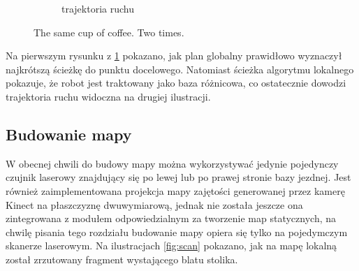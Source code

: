 \begin{figure}[h!]
\begin{subfigure}[b]{0.4\linewidth}
   				 \caption{trajektoria ruchu}
  			\end{subfigure}
  			\caption{The same cup of coffee. Two times.}
 			 \label{fig:plan}
		\end{figure}

		Na pierwszym rysunku z \ref{fig:plan} pokazano, jak plan globalny prawidłowo wyznaczył najkrótszą ścieżkę do punktu docelowego. 
		Natomiast ścieżka algorytmu lokalnego pokazuje, że robot jest traktowany jako baza różnicowa, co ostatecznie dowodzi trajektoria ruchu widoczna na drugiej ilustracji.
		
	\subsection{Budowanie mapy}
		
		W obecnej chwili do budowy mapy można wykorzystywać jedynie pojedynczy czujnik laserowy znajdujący się po lewej lub po prawej stronie bazy jezdnej.
		Jest również zaimplementowana projekcja mapy zajętości generowanej przez kamerę Kinect na płaszczyznę dwuwymiarową, jednak nie została jeszcze ona zintegrowana z modułem odpowiedzialnym za tworzenie map statycznych, na chwilę pisania tego rozdziału budowanie mapy opiera się tylko na pojedymczym skanerze laserowym.
		Na ilustracjach \ref{fig:scan} pokazano, jak na mapę lokalną został zrzutowany fragment wystającego blatu stolika.
			
